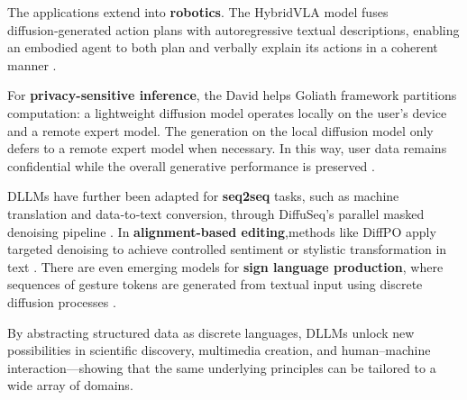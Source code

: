 The applications extend into \textbf{robotics}. The HybridVLA model fuses diffusion‑generated action plans with autoregressive textual descriptions, enabling an embodied agent to both plan and verbally explain its actions in a coherent manner \cite{liu_hybridvla_2025}.


For \textbf{privacy-sensitive inference}, the David helps Goliath framework partitions computation: a lightweight diffusion model operates locally on the user’s device and a remote expert model. The generation on the local diffusion model only defers to a remote expert model when necessary. In this way, user data remains confidential while the overall generative performance is preserved \cite{han_david_2024}.


DLLMs have further been adapted for \textbf{seq2seq} tasks, such as machine translation and data‑to‑text conversion, through DiffuSeq’s parallel masked denoising pipeline \cite{gong_diffuseq_2023}. In \textbf{alignment-based editing},methods like DiffPO apply targeted denoising to achieve controlled sentiment or stylistic transformation in text \cite{chen_diffpo_2025}. There are even emerging models for \textbf{sign language production}, where sequences of gesture tokens are generated from textual input using discrete diffusion processes \cite{he_text-driven_2025}.


By abstracting structured data as discrete languages, DLLMs unlock new possibilities in scientific discovery, multimedia creation, and human–machine interaction—showing that the same underlying principles can be tailored to a wide array of domains.



% 



% 
